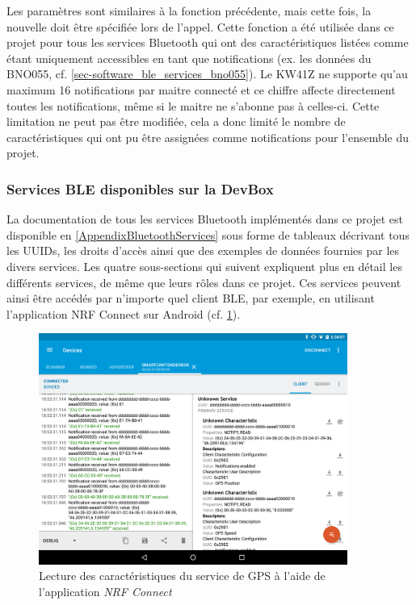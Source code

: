 Les paramètres sont similaires à la fonction précédente, mais cette fois, la nouvelle doit être spécifiée lors de l'appel. Cette fonction a été utilisée dans ce projet pour tous les services Bluetooth qui ont des caractéristiques listées comme étant uniquement accessibles en tant que notifications (ex. les données du BNO055, cf. \cref{sec-software_ble_services_bno055}). Le KW41Z ne supporte qu'au maximum 16 notifications par maitre connecté et ce chiffre affecte directement toutes les notifications, même si le maitre ne s'abonne pas à celles-ci. Cette limitation ne peut pas être modifiée, cela a donc limité le nombre de caractéristiques qui ont pu être assignées comme notifications pour l'ensemble du projet.

\FloatBarrier
\subsubsection{Services BLE disponibles sur la DevBox}
\label{sec-software_ble_services}

La documentation de tous les services Bluetooth implémentés dans ce projet est disponible en \cref{AppendixBluetoothServices} sous forme de tableaux décrivant tous les UUIDs, les droits d'accès ainsi que des exemples de données fournies par les divers services. Les quatre sous-sections qui suivent expliquent plus en détail les différents services, de même que leurs rôles dans ce projet. Ces services peuvent ainsi être accédés par n'importe quel client BLE, par exemple, en utilisant l'application NRF Connect sur Android (cf. \cref{fig-nrf_connect_gps}).


\begin{figure}[ht!]
    \centering
    \includegraphics[width=0.9\textwidth]{Figures/Software/kw41z/nrf_connect_gps.png}
    \caption{Lecture des caractéristiques du service de GPS à l'aide de l'application \textit{NRF Connect}}
    \label{fig-nrf_connect_gps}
\end{figure}


